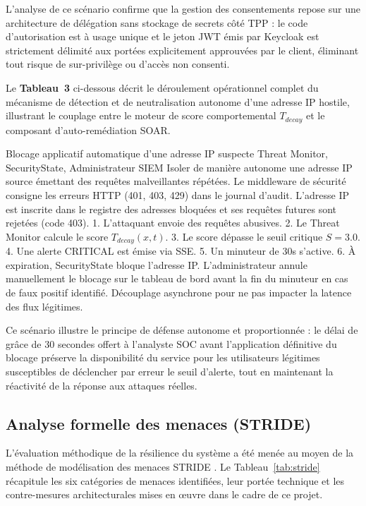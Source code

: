 \noindent L'analyse de ce scénario confirme que la gestion des consentements repose sur une architecture de délégation sans stockage de secrets côté TPP : le code d'autorisation est à usage unique et le jeton JWT émis par Keycloak est strictement délimité aux portées explicitement approuvées par le client, éliminant tout risque de sur-privilège ou d'accès non consenti.

\bigskip
\noindent Le \textbf{Tableau~3} ci-dessous décrit le déroulement opérationnel complet du mécanisme de détection et de neutralisation autonome d'une adresse IP hostile, illustrant le couplage entre le moteur de score comportemental $T_{decay}$ et le composant d'auto-remédiation SOAR.

\scenariotable
{Blocage applicatif automatique d'une adresse IP suspecte}
{Threat Monitor, SecurityState, Administrateur SIEM}
{Isoler de manière autonome une adresse IP source émettant des requêtes malveillantes répétées.}
{Le middleware de sécurité consigne les erreurs HTTP (401, 403, 429) dans le journal d'audit.}
{L'adresse IP est inscrite dans le registre des adresses bloquées et ses requêtes futures sont rejetées (code 403).}
{1. L'attaquant envoie des requêtes abusives. 2. Le Threat Monitor calcule le score $T_{decay}(x,t)$. 3. Le score dépasse le seuil critique $S=3.0$. 4. Une alerte CRITICAL est émise via SSE. 5. Un minuteur de 30s s'active. 6. À expiration, SecurityState bloque l'adresse IP.}
{L'administrateur annule manuellement le blocage sur le tableau de bord avant la fin du minuteur en cas de faux positif identifié.}
{Découplage asynchrone pour ne pas impacter la latence des flux légitimes.}

\noindent Ce scénario illustre le principe de défense autonome et proportionnée : le délai de grâce de 30 secondes offert à l'analyste SOC avant l'application définitive du blocage préserve la disponibilité du service pour les utilisateurs légitimes susceptibles de déclencher par erreur le seuil d'alerte, tout en maintenant la réactivité de la réponse aux attaques réelles.

\subsection{Analyse formelle des menaces (STRIDE)}
L'évaluation méthodique de la résilience du système a été menée au moyen de la méthode de modélisation des menaces STRIDE \cite{stride_model}. Le Tableau~\ref{tab:stride} récapitule les six catégories de menaces identifiées, leur portée technique et les contre-mesures architecturales mises en œuvre dans le cadre de ce projet.

